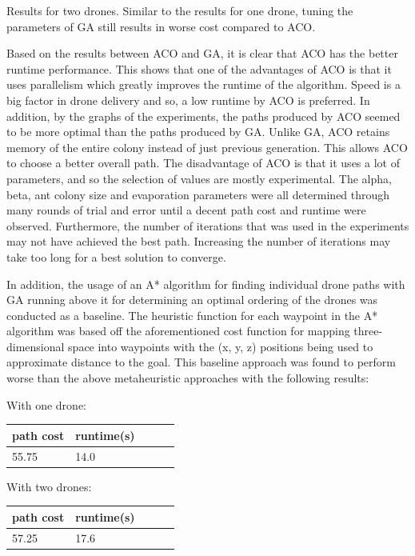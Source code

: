 \documentclass[conference]{IEEEtran}
\begin{document}
Results for two drones. Similar to the results for one drone, tuning the parameters of GA still results in worse cost compared to ACO. 

Based on the results between ACO and GA, it is clear that ACO has the better runtime performance. This shows that one of the advantages of ACO is that it uses parallelism which greatly improves the runtime of the algorithm. Speed is a big factor in drone delivery and so, a low runtime by ACO is preferred. In addition, by the graphs of the experiments, the paths produced by ACO seemed to be more optimal than the paths produced by GA. Unlike GA, ACO retains memory of the entire colony instead of just previous generation. This allows ACO to choose a better overall path. The disadvantage of ACO is that it uses a lot of parameters, and so the selection of values are mostly experimental. The alpha, beta, ant colony size and evaporation parameters were all determined through many rounds of trial and error until a decent path cost and runtime were observed. Furthermore, the number of iterations that was used in the experiments may not have achieved the best path. Increasing the number of iterations may take too long for a best solution to converge.


In addition, the usage of an A* algorithm for finding individual drone paths with GA running above it for determining an optimal ordering of the drones was conducted as a baseline. The heuristic function for each waypoint in the A* algorithm was based off the aforementioned cost function for mapping three-dimensional space into waypoints with the (x, y, z) positions being used to approximate distance to the goal. This baseline approach was found to perform worse than the above metaheuristic approaches with the following results:

With one drone:
\begin{center}
\begin{tabular}{ | m{1cm} | m{1cm}| m{1cm} | m{1.5cm} | m{1.5cm} |} 
\hline
path cost & runtime(s) \\ 
\hline
55.75 & 14.0 \\
\hline
\end{tabular}
\end{center}

With two drones:
\begin{center}
\begin{tabular}{ | m{1cm} | m{1cm}| m{1cm} | m{1.5cm} | m{1.5cm} |} 
\hline
path cost & runtime(s) \\ 
\hline
57.25 & 17.6 \\
\hline
\end{tabular}
\end{center}
\end{document}
